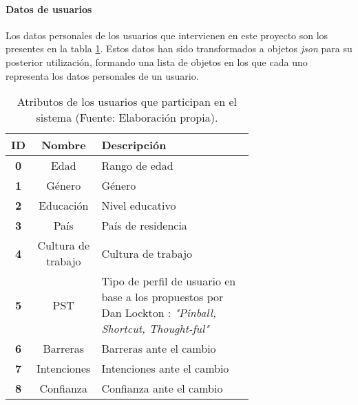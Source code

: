 \paragraph{Datos de usuarios\\}
Los datos personales de los usuarios que intervienen en este proyecto son los presentes en la tabla \ref{tab:AtributosUsuarios}. Estos datos han sido transformados a objetos \textit{json} para su posterior utilización, formando una lista de objetos en los que cada uno representa los datos personales de un usuario.
\begin{table}[H]
    
    \begin{center}
        \begin{tabular}{|c|c|p{0.7\linewidth}|}
            \hline
            \rowcolor{Cyan} 
            \textbf{ID} & \textbf{Nombre} & \textbf{Descripción}\\ 
            \hline
            \textbf{0} &  Edad & Rango de edad\\
            \hline
            \rowcolor{GrisTabla}
            \textbf{1} & Género & Género\\
            \hline
            \textbf{2} & Educación & Nivel educativo\\
            \hline
            \rowcolor{GrisTabla} 
            \textbf{3} & País & País de residencia\\
            \hline
            \textbf{4} & Cultura de trabajo & Cultura de trabajo\\
            \hline
            \rowcolor{GrisTabla} 
            \textbf{5} & PST & Tipo de perfil de usuario en base a los propuestos por Dan Lockton\autocite{locktonModelsUserDesigners2012} : \textit{"Pinball, Shortcut, Thought-ful"}\\ 
            \hline
            \textbf{6} & Barreras  & Barreras ante el cambio\\
            \hline
            \rowcolor{GrisTabla} 
            \textbf{7} & Intenciones & Intenciones ante el cambio\\
            \hline
            \textbf{8} & Confianza  & Confianza ante el cambio\\
            \hline

        \end{tabular}
        \caption{\centering Atributos de los usuarios que participan en el sistema (Fuente: Elaboración propia).}
        \label{tab:AtributosUsuarios}
    \end{center}    
\end{table}
